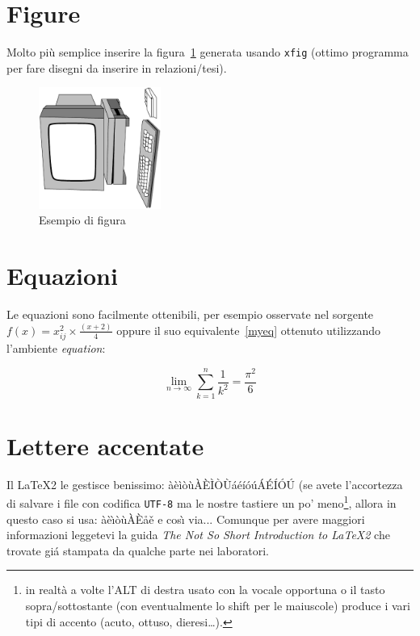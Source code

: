 \section{Figure}
   Molto pi\`u semplice inserire la figura~\ref{miafigura}
   generata usando \texttt{xfig} (ottimo programma
   per fare disegni da inserire in relazioni/tesi). 
   \begin{figure}
   \centering
   \includegraphics[width=4cm]{images/esempio}
   \caption{Esempio di figura\label{miafigura}}
   \end{figure}

\section{Equazioni}
   Le equazioni sono facilmente ottenibili, per esempio
   osservate nel sorgente $f(x)=x^{2}_{ij}\times \frac{(x+2)}{4}$
   oppure il suo equivalente~\ref{myeq} ottenuto utilizzando l'ambiente
   \emph{equation}:

   \begin{equation}
   \lim_{n \to \infty}
   \sum_{k=1}^n \frac{1}{k^2}
   = \frac{\pi^2}{6}
   \label{myeq}
   \end{equation}

\section{Lettere accentate\label{accenti}}

   Il \LaTeX2\/
   le gestisce benissimo: àèìòùÀÈÌÒÙáéíóúÁÉÍÓÚ (se avete l'accortezza di salvare i file con codifica \texttt{UTF-8}
   ma le nostre tastiere un po' meno\footnote{in realt\`a a volte l'ALT di destra
   usato con la vocale opportuna o il tasto sopra/sottostante (con eventualmente lo
   shift per le maiuscole) produce i vari tipi di accento (acuto, ottuso, dieresi\ldots).},
   allora in questo caso si usa:
   \`a\`e\`{\i}\`o\`u\`A\`E\aa\v e e cos\`{\i} via...
   \newpage
   Comunque per avere maggiori informazioni leggetevi la guida \emph{The Not So Short Introduction to \LaTeX2}
   che trovate gi\'a stampata da qualche parte nei laboratori.


